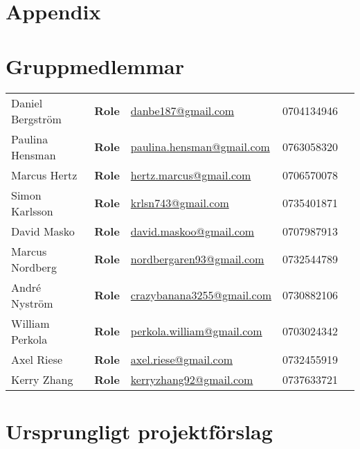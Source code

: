\setcounter{section}{0}
\renewcommand\thesection{\Alph{section}}
\section{Appendix}

\section*{Gruppmedlemmar}

\renewcommand{\arraystretch}{1.5} %
\begin{tabular}{lllll}
  Daniel Bergström & \textbf{Role} & \href{mailto:danbe187@gmail.com}{danbe187@gmail.com} & 0704134946 \\
  Paulina Hensman & \textbf{Role} & \href{mailto:paulina.hensman@gmail.com}{paulina.hensman@gmail.com} & 0763058320 \\
  Marcus Hertz & \textbf{Role} & \href{mailto:hertz.marcus@gmail.com}{hertz.marcus@gmail.com} & 0706570078 \\
  Simon Karlsson & \textbf{Role} & \href{mailto:krlsn743@gmail.com}{krlsn743@gmail.com} & 0735401871 \\
  David Masko & \textbf{Role} & \href{mailto:david.maskoo@gmail.com}{david.maskoo@gmail.com} & 0707987913 \\
  Marcus Nordberg & \textbf{Role} & \href{mailto:nordbergaren93@gmail.com}{nordbergaren93@gmail.com} & 0732544789 \\
  André Nyström & \textbf{Role} & \href{mailto:crazybanana3255@gmail.com}{crazybanana3255@gmail.com} & 0730882106 \\
  William Perkola & \textbf{Role} & \href{mailto:perkola.william@gmail.com}{perkola.william@gmail.com} & 0703024342 \\
  Axel Riese & \textbf{Role} & \href{mailto:axel.riese@gmail.com}{axel.riese@gmail.com} & 0732455919 \\
  Kerry Zhang & \textbf{Role} & \href{mailto:kerryzhang92@gmail.com}{kerryzhang92@gmail.com} & 0737633721 \\
\end{tabular}

\section{Ursprungligt projektförslag}


